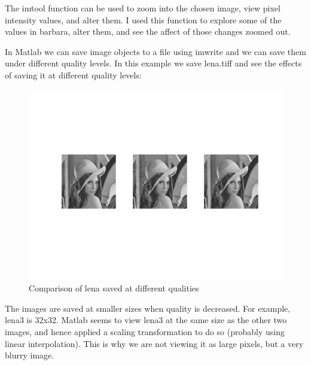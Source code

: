 The imtool function can be used to zoom into the chosen image, view pixel
intensity values, and alter them. I used this function to explore some of the
values in barbara, alter them, and see the affect of those changes zoomed out.

In Matlab we can save image objects to a file using imwrite and we can save them
under different quality levels. In this example we save lena.tiff and see the
effects of saving it at different quality levels:

\begin{figure}[H]
    \centering
    \includegraphics[scale=0.5]{lenaCompare}
    \caption{Comparison of lena saved at different qualities}
\end{figure}

The images are saved at smaller sizes when quality is decreased. For example,
lena3 is 32x32. Matlab seems to view lena3 at the same size as the other two
images, and hence applied a scaling transformation to do so (probably using
linear interpolation). This is why we are not viewing it as large pixels, but a
very blurry image.
